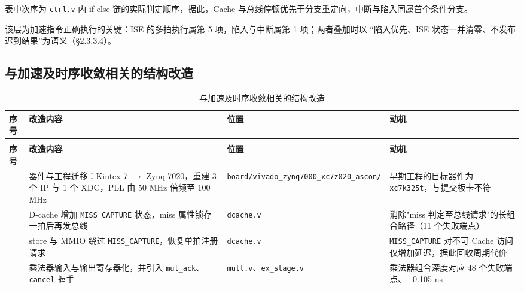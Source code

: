 表中次序为 \texttt{ctrl.\allowbreak{}v} 内 if-else 链的实际判定顺序，据此，Cache 与总线停顿优先于分支重定向，中断与陷入同属首个条件分支。

该层为加速指令正确执行的关键：ISE 的多拍执行属第 5 项，陷入与中断属第 1 项；两者叠加时以 ``陷入优先、ISE 状态一并清零、不发布迟到结果''为语义（§2.3.3.4）。

\Needspace{85pt}

\subsection{与加速及时序收敛相关的结构改造}

{\small
\renewcommand{\thetable}{2-5}
\begin{longtable}{@{}>{\raggedright\arraybackslash}p{}>{\raggedright\arraybackslash}p{}>{\raggedright\arraybackslash}p{}>{\raggedright\arraybackslash}p{}@{}}
\caption{与加速及时序收敛相关的结构改造}\label{tab:2-5}\\
\toprule
\textbf{序号} & \textbf{改造内容} & \textbf{位置} & \textbf{动机} \\
\midrule
\endfirsthead
\multicolumn{4}{@{}l}{\footnotesize 续表 2-5}\\
\toprule
\textbf{序号} & \textbf{改造内容} & \textbf{位置} & \textbf{动机} \\
\midrule
\endhead
1 & 器件与工程迁移：Kintex-7 $\rightarrow$ Zynq-7020，重建 3 个 IP 与 1 个 XDC，PLL 由 50 MHz 倍频至 100 MHz & \texttt{board/\allowbreak{}vivado\_\allowbreak{}\allowbreak{}zynq7000\_\allowbreak{}\allowbreak{}xc7z020\_\allowbreak{}\allowbreak{}ascon/\allowbreak{}} & 早期工程的目标器件为 \texttt{xc7k325t}，与提交板卡不符 \\
2 & D-cache 增加 \texttt{MISS\_\allowbreak{}\allowbreak{}CAPTURE} 状态，miss 属性锁存一拍后再发总线 & \texttt{dcache.\allowbreak{}v} & 消除"miss 判定至总线请求"的长组合路径（11 个失败端点） \\
3 & store 与 MMIO 绕过 \texttt{MISS\_\allowbreak{}\allowbreak{}CAPTURE}，恢复单拍注册请求 & \texttt{dcache.\allowbreak{}v} & \texttt{MISS\_\allowbreak{}\allowbreak{}CAPTURE} 对不可 Cache 访问仅增加延迟，据此回收周期代价 \\
4 & 乘法器输入与输出寄存器化，并引入 \texttt{mul\_\allowbreak{}\allowbreak{}ack}、\texttt{cancel} 握手 & \texttt{mult.\allowbreak{}v}、\texttt{ex\_\allowbreak{}\allowbreak{}stage.\allowbreak{}v} & 乘法器组合深度对应 48 个失败端点、$-$0.105 ns \\

\end{longtable}}
